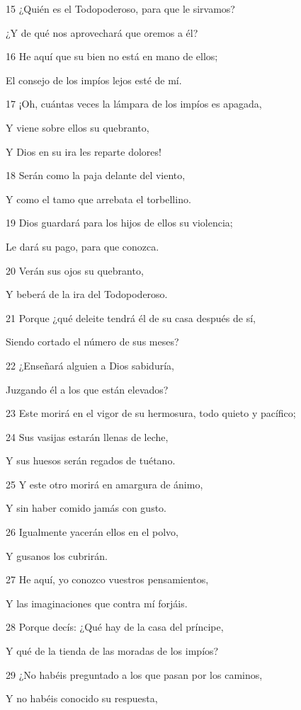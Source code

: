 \par 15 ¿Quién es el Todopoderoso, para que le sirvamos?
\par ¿Y de qué nos aprovechará que oremos a él?
\par 16 He aquí que su bien no está en mano de ellos;
\par El consejo de los impíos lejos esté de mí.
\par 17 ¡Oh, cuántas veces la lámpara de los impíos es apagada,
\par Y viene sobre ellos su quebranto,
\par Y Dios en su ira les reparte dolores!
\par 18 Serán como la paja delante del viento,
\par Y como el tamo que arrebata el torbellino.
\par 19 Dios guardará para los hijos de ellos su violencia;
\par Le dará su pago, para que conozca.
\par 20 Verán sus ojos su quebranto,
\par Y beberá de la ira del Todopoderoso.
\par 21 Porque ¿qué deleite tendrá él de su casa después de sí,
\par Siendo cortado el número de sus meses?
\par 22 ¿Enseñará alguien a Dios sabiduría,
\par Juzgando él a los que están elevados?
\par 23 Este morirá en el vigor de su hermosura, todo quieto y pacífico;
\par 24 Sus vasijas estarán llenas de leche,
\par Y sus huesos serán regados de tuétano.
\par 25 Y este otro morirá en amargura de ánimo,
\par Y sin haber comido jamás con gusto.
\par 26 Igualmente yacerán ellos en el polvo,
\par Y gusanos los cubrirán.
\par 27 He aquí, yo conozco vuestros pensamientos,
\par Y las imaginaciones que contra mí forjáis.
\par 28 Porque decís: ¿Qué hay de la casa del príncipe,
\par Y qué de la tienda de las moradas de los impíos?
\par 29 ¿No habéis preguntado a los que pasan por los caminos,
\par Y no habéis conocido su respuesta,
